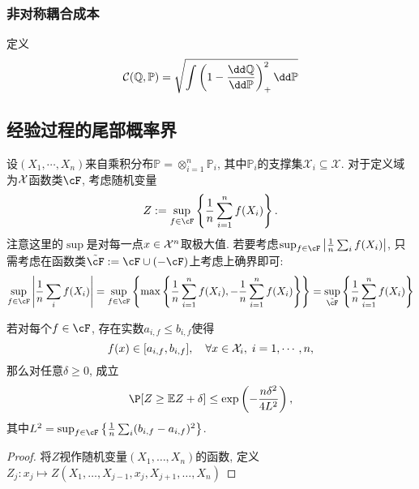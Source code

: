 \subsubsection{非对称耦合成本}

定义
\begin{align*}
	\cC(\mathbb{Q}, \mathbb{P})
	= \sqrt{\int\left(1 - \frac{\dd \mathbb{Q}}{\dd \mathbb{P}} \right)_+^2 \dd \mathbb{P}}
\end{align*}



\subsection{经验过程的尾部概率界}

设$(X_1, \cdots, X_n)$来自乘积分布$\mathbb{P} = \otimes_{i=1}^n \mathbb{P}_i$, 其中$\mathbb{P}_i$的支撑集$\mathcal{X}_i \subseteq \mathcal{X}$. 
对于定义域为$\mathcal{X}$函数类$\cF$, 考虑随机变量
\begin{equation*}
	Z := \sup_{f \in \cF} \left\{ \frac{1}{n} \sum_{i=1}^n f(X_i) \right\}. 
\end{equation*}
注意这里的$\sup$是对每一点$x \in \mathcal{X}^n$取极大值. 
若要考虑$\sup_{f \in \cF} \left| \frac{1}{n} \sum_i f(X_i) \right|$, 只需考虑在函数类$\tilde \cF := \cF \cup (- \cF)$上考虑上确界即可: 
\begin{equation*}
	\sup_{f \in \cF} \left| \frac{1}{n} \sum_i f(X_i) \right|
	= \sup_{f \in \cF} \left\{ \max \left\{ \frac{1}{n} \sum_{i=1}^n f(X_i), - \frac{1}{n} \sum_{i=1}^n f(X_i) \right\} \right\} 
	= \sup_{\tilde \cF} \left\{ \frac{1}{n} \sum_{i=1}^n f(X_i) \right\}
\end{equation*}

\begin{theorem}[泛函Hoeffding不等式]
	若对每个$f \in \cF$, 存在实数$a_{i, f} \leq b_{i, f}$使得
	\begin{equation*}
		f(x) \in [a_{i, f}, b_{i, f}],\quad \forall x \in \mathcal{X}_i,\; i = 1, \cdots, n, 
	\end{equation*}
	那么对任意$\delta \geq 0$, 成立
	\begin{equation}
		\P[ Z \geq \mathbb{E}Z + \delta] 
		\leq \exp \left( - \frac{n \delta^2}{4 L^2} \right), 
	\end{equation}
	其中$L^2 = \sup_{f \in \cF} \left\{ \frac{1}{n} \sum_i (b_{i, f} - a_{i, f})^2 \right\}$. 
\end{theorem}

\begin{proof}
	将$Z$视作随机变量$(X_1, \dots, X_n)$的函数, 定义$Z_j \colon x_j \mapsto Z(X_1, \dots, X_{j-1}, x_j, X_{j+1}, \dots, X_n)$
\end{proof}























